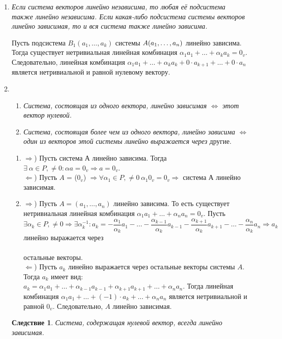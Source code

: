 \begin{enumerate}
	\item \textit{Если система векторов линейно независима, то любая её подсистема также линейно независима. Если какая-либо подсистема системы векторов линейно зависимая, то и вся система также линейно зависима.}
	
	\begin{Proof}
		Пусть подсистема $B_1(a_1,\dots,a_k)$ системы $A(a_1,\dots,a_n)$ линейно зависима. Тогда существует нетривиальная линейная комбинация $\alpha_1 a_1 + \ldots + \alpha_k a_k = 0_v$. Следовательно, линейная комбинация $\alpha_1 a_1 + \ldots + \alpha_k a_k + 0\cdot a_{k+1} + \ldots + 0\cdot a_n$ является нетривиальной и равной нулевому вектору.
	\end{Proof}
	\item \begin{enumerate}
		\item \textit{Система, состоящая из одного вектора, линейно зависимая $\Longleftrightarrow$ этот вектор нулевой.}
		\item \textit{Система, состоящая более чем из одного вектора, линейно зависима $\Longleftrightarrow$ один из векторов этой системы линейно выражается через} другие.
	\end{enumerate} 
	
	
	\begin{Proof} \begin{enumerate} \item $\Rightarrow$) Пусть система $А$ линейно зависима. Тогда $\exists\ \alpha\in P, \ne 0: \alpha a = 0_v \Rightarrow a = 0_v$.\\
			$\Leftarrow$) Пусть $A$ = ($0_v$) $\Rightarrow \forall \alpha_1\in P, \ne 0\  \alpha_1 0_v = 0_v \Rightarrow $ система $А$ линейно зависимая.
			\item $\Rightarrow$) Пусть $A = (a_1, \dots, a_n)$ линейно зависима. То есть существует нетривиальная линейная комбинация $ \alpha_1 a_1 + \ldots + \alpha_n a_n = 0_v$. Пусть $\exists \alpha_k \in P, \ne 0 \Rightarrow \exists \alpha_k^{-1}: a_k = -\dfrac{\alpha_1}{\alpha_k} a_1 - \ldots - \dfrac{\alpha_{k-1}} {\alpha_k} a_{k-1} - \dfrac{\alpha_{k+1}}{\alpha_k}a_{k+1} - \ldots - \dfrac{\alpha_n}{\alpha_k} a_n\Rightarrow a_k$ линейно выражается через\\\\ остальные векторы.\\
			$\Leftarrow$) Пусть $a_k$ линейно выражается через остальные векторы системы $A$. Тогда $a_k$ имеет вид:\\ $a_k= \alpha_1 a_1 + \ldots + \alpha_{k-1} a_{k-1} + \alpha_{k+1} a_{k+1} + \ldots + \alpha_n a_n$. Тогда линейная комбинация $\alpha_1 a_1 + \ldots + (-1)\cdot a_k + \ldots + \alpha_n a_n$ является нетривиальной и равной $0_v$. Следовательно, $A$ линейно зависимая.
		\end{enumerate}
	\end{Proof}
	\newtheorem*{Cor3*}{Следствие} \begin{Cor3*} Система, содержащая нулевой вектор, всегда линейно зависимая. \end{Cor3*} 
	

\end{enumerate}
